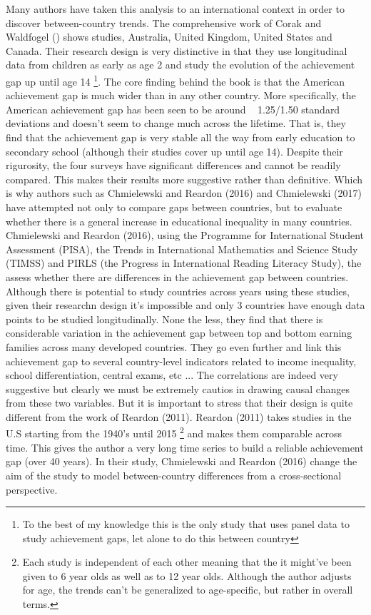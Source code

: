 \documentclass[11pt, a4paper]{article}\usepackage[]{graphicx}\usepackage[]{color}
\begin{document}
Many authors have taken this analysis to an international context in order to discover between-country trends. The comprehensive work of Corak and Waldfogel () shows studies, Australia, United Kingdom, United States and Canada. Their research design is very distinctive in that they use longitudinal data from children as early as age 2 and study the evolution of the achievement gap up until age 14 \footnote{To the best of my knowledge this is the only study that uses panel data to study achievement gaps, let alone to do this between country}. The core finding behind the book is that the American achievement gap is much wider than in any other country. More specifically, the American achievement gap has been seen to be around ~ 1.25/1.50 standard deviations and doesn't seem to change much across the lifetime. That is, they find that the achievement gap is very stable all the way from early education to secondary school (although their studies cover up until age 14). Despite their rigurosity, the four surveys have significant differences and cannot be readily compared. This makes their results more suggestive rather than definitive. Which is why authors such as Chmielewski and Reardon (2016) and Chmielewski (2017) have attempted not only to compare gaps between countries, but to evaluate whether there is a general increase in educational inequality in many countries.  Chmielewski and Reardon (2016), using the Programme for International Student Assessment (PISA), the Trends in International Mathematics and Science Study (TIMSS) and PIRLS (the Progress in International Reading Literacy Study), the assess whether there are differences in the achievement gap between countries. Although there is potential to study countries across years using these studies, given their researchn design it's impossible and only 3 countries have enough data points to be studied longitudinally. None the less, they find that there is considerable variation in the achievement gap between top and bottom earning families across many developed countries. They go even further and link this achievement gap to several country-level indicators related to income inequality, school differentiation, central exams, etc ... The correlations are indeed very suggestive but clearly we must be extremely cautios in drawing causal changes from these two variables. But it is important to stress that their design is quite different from the work of Reardon (2011). Reardon (2011) takes studies in the U.S starting from the 1940's until 2015 \footnote{Each study is independent of each other meaning that the it might've been given to 6 year olds as well as to 12 year olds. Although the author adjusts for age, the trends can't be generalized to age-specific, but rather in overall terms.} and makes them comparable across time. This gives the author a very long time series to build a reliable achievement gap (over 40 years). In their study, Chmielewski and Reardon (2016) change the aim of the study to model between-country differences from a cross-sectional perspective.
\end{document}
